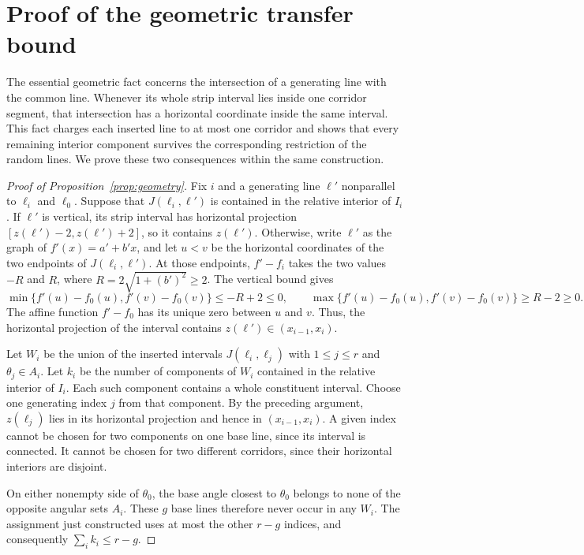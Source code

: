 \documentclass[11pt,letterpaper]{article}
\begin{document}
\section{Proof of the geometric transfer bound}

The essential geometric fact concerns the intersection of a generating line with the common line. Whenever its whole strip interval lies inside one corridor segment, that intersection has a horizontal coordinate inside the same interval. This fact charges each inserted line to at most one corridor and shows that every remaining interior component survives the corresponding restriction of the random lines. We prove these two consequences within the same construction.

\begin{proof}[Proof of Proposition~\ref{prop:geometry}]
Fix $i$ and a generating line $\ell'$ nonparallel to $\ell_i$ and $\ell_0$. Suppose that $J(\ell_i,\ell')$ is contained in the relative interior of $I_i$. If $\ell'$ is vertical, its strip interval has horizontal projection $[z(\ell')-2,z(\ell')+2]$, so it contains $z(\ell')$. Otherwise, write $\ell'$ as the graph of $f'(x)=a'+b'x$, and let $u<v$ be the horizontal coordinates of the two endpoints of $J(\ell_i,\ell')$. At those endpoints, $f'-f_i$ takes the two values $-R$ and $R$, where $R=2\sqrt{1+(b')^2}\ge2$. The vertical bound gives
\begin{equation}\label{eq:root}
 \min\{f'(u)-f_0(u),f'(v)-f_0(v)\}\le -R+2\le0,
 \qquad
 \max\{f'(u)-f_0(u),f'(v)-f_0(v)\}\ge R-2\ge0.
\end{equation}
The affine function $f'-f_0$ has its unique zero between $u$ and $v$. Thus, the horizontal projection of the interval contains $z(\ell')\in(x_{i-1},x_i)$.

Let $W_i$ be the union of the inserted intervals $J(\ell_i,\ell_j)$ with $1\le j\le r$ and $\theta_j\in A_i$. Let $k_i$ be the number of components of $W_i$ contained in the relative interior of $I_i$. Each such component contains a whole constituent interval. Choose one generating index $j$ from that component. By the preceding argument, $z(\ell_j)$ lies in its horizontal projection and hence in $(x_{i-1},x_i)$. A given index cannot be chosen for two components on one base line, since its interval is connected. It cannot be chosen for two different corridors, since their horizontal interiors are disjoint.

On either nonempty side of $\theta_0$, the base angle closest to $\theta_0$ belongs to none of the opposite angular sets $A_i$. These $g$ base lines therefore never occur in any $W_i$. The assignment just constructed uses at most the other $r-g$ indices, and consequently $\sum_i k_i\le r-g$.


\end{proof}
\end{document}
